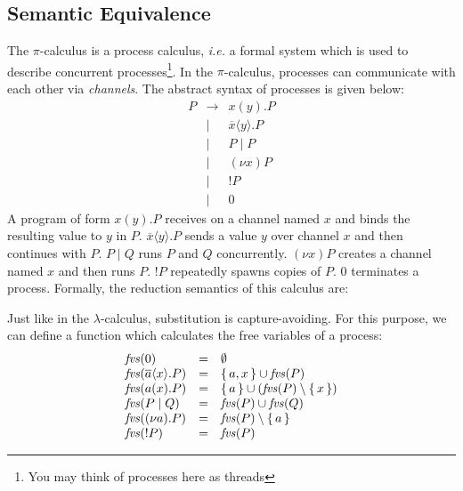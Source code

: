 \documentclass[10pt,a4paper]{exam} %
\begin{document}
\begin{questions}
\section*{Semantic Equivalence}

\newcommand{\receive}[2]{#1(#2)}
\newcommand{\send}[2]{\overline{#1}\langle #2 \rangle}
\newcommand{\channel}[1]{(\nu #1)}

\question The $\pi$-calculus is a process calculus, \emph{i.e.} a formal system which is used to describe concurrent processes\footnote{You may think of processes here as threads}. In the $\pi$-calculus, processes can communicate with each other via \emph{channels}. The abstract syntax of processes is given below:
\begin{displaymath}
\begin{array}{lcl}
P & \to & \receive{x}{y}.P\\
  & \mid & \send{x}{y}.P\\
  & \mid & P \mid P \\
  & \mid & \channel{x}P\\
  & \mid & !P\\
  & \mid & 0
\end{array}
\end{displaymath}
A program of form $\receive{x}{y}.P$ receives on a channel named $x$ and binds the resulting value to $y$ in $P$. $\send{x}{y}.P$ sends a value $y$ over channel $x$ and then continues with $P$. $P \mid Q$ runs $P$ and $Q$ concurrently. $\channel{x}P$ creates a channel named $x$ and then runs $P$. $!P$ repeatedly spawns copies of $P$. $0$ terminates a process. Formally, the reduction semantics of this calculus are:
Just like in the $\lambda$-calculus, substitution is capture-avoiding. For this purpose, we can define a function which calculates the free variables of a process:
\begin{displaymath}
\begin{array}{lcl}
\mathit{fvs}(0) & = & \emptyset \\
\mathit{fvs}(\send{a}{x}.P) & = & \set{a,x} \cup \mathit{fvs}(P) \\
\mathit{fvs}(\receive{a}{x}.P) & = & \set{a} \cup (\mathit{fvs}(P) \setminus \set{x} ) \\
\mathit{fvs}(P \mid Q) & = & \mathit{fvs}(P) \cup \mathit{fvs}(Q) \\
\mathit{fvs}(\channel{a}.P) & = & \mathit{fvs}(P) \setminus \set{a} \\
\mathit{fvs}(!P) & = & \mathit{fvs}(P)
\end{array}
\end{displaymath}
\begin{parts}

\end{parts}
\end{questions}
\end{document}
